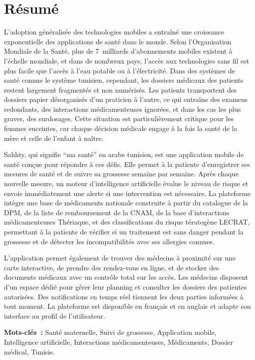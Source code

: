 \newpage
\chapter*{Résumé}

L'adoption généralisée des technologies mobiles a entraîné une croissance exponentielle
des applications de santé dans le monde. Selon l'Organisation Mondiale de la Santé,
plus de 7~milliards d'abonnements mobiles existent à l'échelle mondiale, et dans de
nombreux pays, l'accès aux technologies sans fil est plus facile que l'accès à l'eau
potable ou à l'électricité. Dans des systèmes de santé comme le système tunisien,
cependant, les dossiers médicaux des patients restent largement fragmentés et non
numérisés. Les patients transportent des dossiers papier désorganisés d'un praticien à
l'autre, ce qui entraîne des examens redondants, des interactions médicamenteuses
ignorées, et dans les cas les plus graves, des surdosages. Cette situation est
particulièrement critique pour les femmes enceintes, car chaque décision médicale
engage à la fois la santé de la mère et celle de l'enfant à naître.

Sahhty, qui signifie ``ma santé'' en arabe tunisien, est une application mobile de santé
conçue pour répondre à ces défis. Elle permet à la patiente d'enregistrer ses mesures de
santé et de suivre sa grossesse semaine par semaine. Après chaque nouvelle mesure, un
moteur d'intelligence artificielle évalue le niveau de risque et envoie immédiatement
une alerte si une intervention est nécessaire. La plateforme intègre une base de
médicaments nationale construite à partir du catalogue de la DPM, de la liste de
remboursement de la CNAM, de la base d'interactions médicamenteuses Thériaque, et
des classifications du risque tératogène LECRAT, permettant à la patiente de vérifier si
un traitement est sans danger pendant la grossesse et de détecter les incompatibilités
avec ses allergies connues.

L'application permet également de trouver des médecins à proximité sur une carte
interactive, de prendre des rendez-vous en ligne, et de stocker des documents médicaux
avec un contrôle total sur les accès. Les médecins disposent d'un espace dédié pour
gérer leur planning et consulter les dossiers des patientes autorisées. Des notifications
en temps réel tiennent les deux parties informées à tout moment. La plateforme est
disponible en français et en anglais et adapte son interface au profil de l'utilisateur.

\bigskip
\noindent\textbf{Mots-clés~:} Santé maternelle, Suivi de grossesse, Application mobile,
Intelligence artificielle, Interactions médicamenteuses, Médicaments, Dossier médical,
Tunisie.
